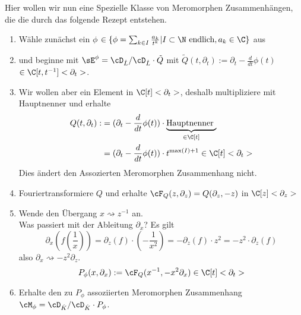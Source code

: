 \begin{comment}
\cite[5.b.]{sabbah_Fourier-local}
\end{comment}
Hier wollen wir nun eine Spezielle Klasse von Meromorphen Zusammenhängen, die
die durch das folgende Rezept entstehen.
\begin{enumerate}
\item Wähle zunächst ein $\phi$
$\in\{\phi=\sum_{k\in I}\frac{a_k}{t^{k}}|I\subset\N\mbox{ endlich},a_k\in \C\}$
aus 
\item und beginne mit $\sE^{\phi}=\cD_{\hat L}/\cD_{\hat L}\cdot \tilde Q$
mit
$ \tilde Q(t,\partial_t):=\partial_t-\frac{d}{dt}\phi(t)$
$\in\C[t,t^{-1}]<\partial_t>$.
\item Wir wollen aber ein Element in $\C[t]<\partial_t>$,
deshalb multipliziere mit Hauptnenner und erhalte
\begin{align*}
Q(t,\partial_t):&=(\partial_t-\frac{d}{dt}\phi(t)) \cdot
  \underset{\in\C[t]}{\underbrace{\mbox{Hauptnenner }}}\\
&=(\partial_t-\frac{d}{dt}\phi(t)) \cdot t^{\max(I)+1} \in\C[t]<\partial_t>
\end{align*}
Dies ändert den Assozierten Meromorphen Zusammenhang nicht.
\begin{comment}
Lemma?
\end{comment}
\item Fouriertransformiere $Q$ und erhalte
$\cF_Q(z,\partial_z)=Q(\partial_z,-z)$ in $\C[z]<\partial_z>$
\item Wende den Übergang $x\rightsquigarrow z^{-1}$ an.\\
Was passiert mit der Ableitung $\partial_x$? Es gilt
\[
\partial_x (f(\frac{1}{x}))=
\partial_z(f)\cdot (-\frac{1}{x^2})=
-\partial_z(f)\cdot z^2= %
- z^2 \cdot \partial_z(f)
\]
also $ \partial_x\rightsquigarrow-z^2\partial_z $.
\[
P_\phi(x,\partial_x):=\cF_Q(x^{-1},-x^2\partial_x) \in \C[t]<\partial_t>
\]
\item Erhalte den zu $P_\phi$ assoziierten Meromorphen Zusammenhang
$\cM_\phi=\cD_{\hat K}/\cD_{\hat K}\cdot P_{\phi}$.
\end{enumerate}

\begin{comment}
warum sind diese wichtig??
\end{comment}

